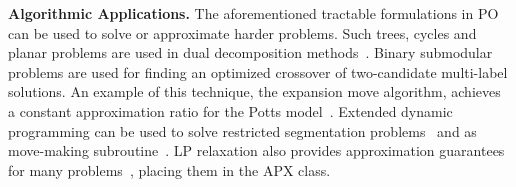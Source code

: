 \textbf{Algorithmic Applications.}
The aforementioned tractable formulations in PO can be used to solve or approximate harder problems. Such trees, cycles and planar problems are used in dual decomposition methods~\cite{Komodakis-subgradient,KomodakisP08,BatraGPC10}. Binary submodular problems are used for finding an optimized crossover of two-candidate multi-label solutions. An example of this technique, the expansion move algorithm, achieves a constant approximation ratio for the Potts model~\cite{boykov2001approximate}. Extended dynamic programming can be used to solve restricted segmentation problems~\cite{Felzenszwalb-10-Tiered} and as move-making subroutine~\cite{VineetWT12}.
LP relaxation also provides approximation guarantees for many problems~\cite{Kleinberg99,Chekuri-01,Komodakis-07,BachHG15}, placing them in the APX class.
%


